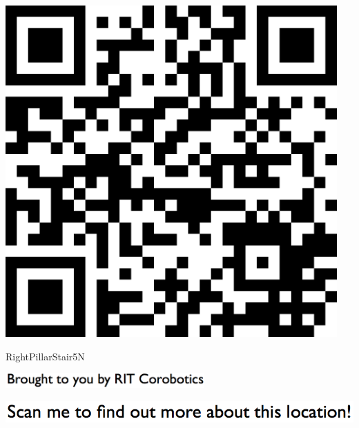\documentclass[letterpaper]{article}
\begin{document}
 \begingroup 
 \centerline{\includegraphics[scale=1,width=5in,height=5in]{RightPillarStair5N.png}} 
 \endgroup 
 \vspace*{\fill} 

 \hfill{\small RightPillarStair5N} 

  \vspace{0.7in} 
 
 \centerline{\includegraphics[scale=1,width=3in]{text-bottom.png}} 
 
 \pagebreak 
{} 
 \vspace*{\fill} 
 
  \centerline{\includegraphics[scale=1,width=6in]{text-top.png}} 
 
 \vspace{0.5in} 
 
\end{document}

